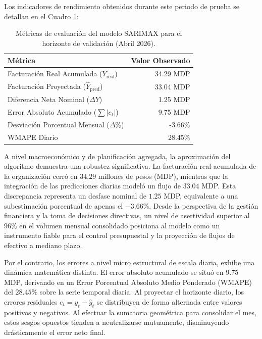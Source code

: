 \documentclass[11pt,a4paper]{report}
\begin{document}
        Los indicadores de rendimiento obtenidos durante este periodo de prueba se detallan en el Cuadro \ref{tab:metricas_abril_final}:

        \begin{table}[H]
            \centering
            \caption{Métricas de evaluación del modelo SARIMAX para el horizonte de validación (Abril 2026).}
            \label{tab:metricas_abril_final}
            \begin{tabular}{lr}
                \toprule
                \textbf{Métrica} & \textbf{Valor Observado} \\
                \midrule
                Facturación Real Acumulada ($Y_{\text{real}}$) & 34.29 MDP \\
                Facturación Proyectada ($\hat{Y}_{\text{pred}}$) & 33.04 MDP \\
                Diferencia Neta Nominal ($\Delta Y$) & 1.25 MDP \\
                Error Absoluto Acumulado ($\sum |e_t|$) & 9.75 MDP \\
                Desviación Porcentual Mensual ($\Delta\%$) & -3.66\% \\
                WMAPE Diario & 28.45\% \\
                \bottomrule
            \end{tabular}
        \end{table}

        A nivel macroeconómico y de planificación agregada, la aproximación del algoritmo demuestra una robustez significativa.
        La facturación real acumulada de la organización cerró en $34.29$ millones de pesos (MDP), mientras que la integración de las
        predicciones diarias modeló un flujo de $33.04$ MDP. Esta discrepancia representa un desfase nominal de $1.25$ MDP, equivalente a
        una subestimación porcentual de apenas el $-3.66\%$. Desde la perspectiva de la gestión financiera y la toma de decisiones directivas,
        un nivel de asertividad superior al $96\%$ en el volumen mensual consolidado posiciona al modelo como un instrumento fiable para el control 
        presupuestal y la proyección de flujos de efectivo a mediano plazo.

        Por el contrario, los errores a nivel micro estructural de escala diaria, exhibe una dinámica matemática distinta.
        El error absoluto acumulado se situó en $9.75$ MDP, derivando en un Error Porcentual Absoluto Medio Ponderado (WMAPE) del $28.45\%$ sobre la
        serie temporal diaria.
        Al proyectar el horizonte diario, los errores residuales $e_t = y_t - \hat{y}_t$ se distribuyen de forma alternada entre valores positivos y negativos.
        Al efectuar la sumatoria geométrica para consolidar el mes, estos sesgos opuestos tienden a neutralizarse mutuamente, disminuyendo drásticamente el error neto final.
\end{document}

